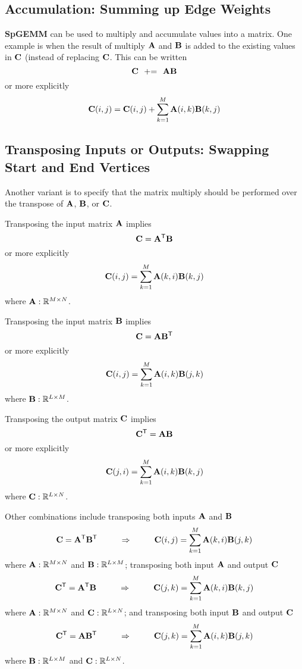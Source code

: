 \subsection{Accumulation: Summing up Edge Weights}

{\bf SpGEMM} can be used to multiply and accumulate values into a matrix.  One example is when the result of multiply ${\bf A}$ and ${\bf B}$ is added to the existing values in ${\bf C}$ (instead of replacing ${\bf C}$.  This can be written
$$
   {\bf C} ~~ {+}{=} ~~ {\bf A} {\bf B}
$$
or more explicitly
$$
   {\bf C}(i,j) = {\bf C}(i,j) + \sum_{k=1}^M {\bf A}(i,k) {\bf B}(k,j)
$$

\subsection{Transposing Inputs or Outputs: Swapping Start and End Vertices}

Another variant is to specify that the matrix multiply should be performed over the transpose of  ${\bf A}$, ${\bf B}$, or ${\bf C}$.

Transposing the input matrix ${\bf A}$ implies
$$
   {\bf C} = {\bf A}^{\sf T} {\bf B}
$$
or more explicitly
$$
   {\bf C}(i,j) = \sum_{k=1}^M {\bf A}(k,i) {\bf B}(k,j)
$$
where ${\bf A}: \mathbb{R}^{M \times N}$.

Transposing the input matrix ${\bf B}$ implies
$$
   {\bf C} = {\bf A} {\bf B}^{\sf T}
$$
or more explicitly
$$
   {\bf C}(i,j) = \sum_{k=1}^M {\bf A}(i,k) {\bf B}(j,k)
$$
where ${\bf B}: \mathbb{R}^{L \times M}$.


Transposing the output matrix ${\bf C}$ implies
$$
   {\bf C}^{\sf T} = {\bf A} {\bf B}
$$
or more explicitly
$$
   {\bf C}(j,i) = \sum_{k=1}^M {\bf A}(i,k) {\bf B}(k,j)
$$
where ${\bf C}: \mathbb{R}^{L \times N}$.

Other combinations include transposing both inputs ${\bf A}$ and ${\bf B}$
$$
   {\bf C} = {\bf A}^{\sf T} {\bf B}^{\sf T} ~~~~~~~~ \Rightarrow ~~~~~~~~ {\bf C}(i,j) = \sum_{k=1}^M {\bf A}(k,i) {\bf B}(j,k)
$$
where ${\bf A}: \mathbb{R}^{M \times N}$ and ${\bf B}: \mathbb{R}^{L \times M}$; transposing both input ${\bf A}$ and output ${\bf C}$
$$
   {\bf C}^{\sf T} = {\bf A}^{\sf T} {\bf B} ~~~~~~~~ \Rightarrow ~~~~~~~~ {\bf C}(j,k) = \sum_{k=1}^M {\bf A}(k,i) {\bf B}(k,j)
$$
where ${\bf A}: \mathbb{R}^{M \times N}$ and ${\bf C}: \mathbb{R}^{L \times N}$; and transposing both input ${\bf B}$ and output ${\bf C}$
$$
   {\bf C}^{\sf T} = {\bf A} {\bf B}^{\sf T} ~~~~~~~~ \Rightarrow ~~~~~~~~ {\bf C}(j,k) = \sum_{k=1}^M {\bf A}(i,k) {\bf B}(j,k)
$$
where ${\bf B}: \mathbb{R}^{L \times M}$ and ${\bf C}: \mathbb{R}^{L \times N}$.

